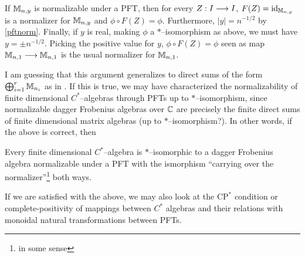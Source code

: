 \documentclass[./Thick_TQFTs_and_Quantum_Information.tex]{subfiles}
\begin{document}
If $\mathbb{M}_{n, y}$ is normalizable under a PFT, then for every $Z : I \stackrel{}{\longrightarrow} I$,
$F(Z) = \text{id}_{\mathbb{M}_{n, y}}$ is a normalizer for $\mathbb{M}_{n, y}$ and
$\phi \circ F(Z) = \phi$. Furthermore, $|y| = n^{-1/2}$ by \ref{pftnorm}.
Finally, if $y$ is real, making $\phi$ a $*$--isomorphism as above, we must have
$y = \pm n^{-1/2}$. Picking the positive value for $y$,
$\phi \circ F(Z) = \phi$ seen as map $\mathbb{M}_{n, 1} \stackrel{}{\longrightarrow} \mathbb{M}_{n, 1}$ is the usual
normalizer for $\mathbb{M}_{n, 1}$.

I am guessing that this argument generalizes to direct sums of the form
$\bigoplus_{i = 1}^r \mathbb{M}_{n_i}$ as in \cite[10]{CatQChan}.  If this is true, we
may have characterized the normalizability of finite dimensional $C^*$--algebras
through PFTs up to $*$--isomorphism, since normalizable dagger Frobenius
algebras over $\mathbb{C}$ are precisely the finite direct sums of finite dimensional
matrix algebras (up to $*$--isomorphism?). In other words, if the above is
correct, then
\begin{thm}
Every finite dimensional $C^*$--algebra is $*$--isomorphic to a dagger Frobenius
algebra normalizable under a PFT with the ismorphism ``carrying over the
normalizer''\footnote{in some sense} both ways.
\end{thm}

If we are satisfied with the above, we may also look at the $\text{CP}^*$
condition or complete-positivity of mappings between $C^*$ algebras and their
relations with monoidal natural transformations between PFTs.
\end{document}
